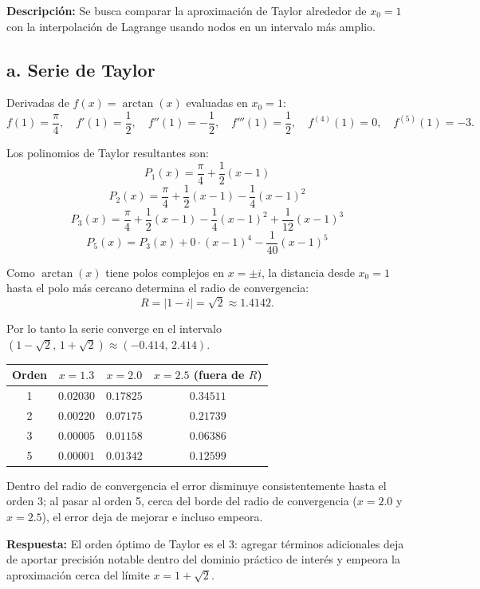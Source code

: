 \documentclass[12pt,a4paper]{article}
\begin{document}
\textbf{Descripci\'on:} Se busca comparar la aproximaci\'on de Taylor alrededor de $x_0=1$ con la interpolaci\'on de Lagrange usando nodos en un intervalo m\'as amplio.

\subsection*{a. Serie de Taylor}

Derivadas de $f(x) = \arctan(x)$ evaluadas en $x_0=1$:
\[
f(1) = \frac{\pi}{4}, \quad f'(1) = \frac{1}{2}, \quad f''(1) = -\frac{1}{2}, \quad f'''(1) = \frac{1}{2}, \quad f^{(4)}(1) = 0, \quad f^{(5)}(1) = -3.
\]

Los polinomios de Taylor resultantes son:
\[
P_1(x) = \frac{\pi}{4} + \frac{1}{2}(x-1)
\]
\[
P_2(x) = \frac{\pi}{4} + \frac{1}{2}(x-1) - \frac{1}{4}(x-1)^2
\]
\[
P_3(x) = \frac{\pi}{4} + \frac{1}{2}(x-1) - \frac{1}{4}(x-1)^2 + \frac{1}{12}(x-1)^3
\]
\[
P_5(x) = P_3(x) + 0\cdot(x-1)^4 - \frac{1}{40}(x-1)^5
\]

Como $\arctan(x)$ tiene polos complejos en $x=\pm i$, la distancia desde $x_0=1$ hasta el polo m\'as cercano determina el radio de convergencia:
\[
R = |1-i| = \sqrt{2} \approx 1.4142.
\]

Por lo tanto la serie converge en el intervalo $(1-\sqrt{2},\, 1+\sqrt{2}) \approx (-0.414,\, 2.414)$.

\begin{center}
\begin{tabular}{cccc}
\toprule
Orden & $x=1.3$ & $x=2.0$ & $x=2.5$ (fuera de $R$) \\
\midrule
1 & $0.02030$ & $0.17825$ & $0.34511$ \\
2 & $0.00220$ & $0.07175$ & $0.21739$ \\
3 & $0.00005$ & $0.01158$ & $0.06386$ \\
5 & $0.00001$ & $0.01342$ & $0.12599$ \\
\bottomrule
\end{tabular}
\end{center}

Dentro del radio de convergencia el error disminuye consistentemente hasta el orden 3; al pasar al orden 5, cerca del borde del radio de convergencia ($x=2.0$ y $x=2.5$), el error deja de mejorar e incluso empeora.

\textbf{Respuesta:} El orden \'optimo de Taylor es el $\boxed{3}$: agregar t\'erminos adicionales deja de aportar precisi\'on notable dentro del dominio pr\'actico de inter\'es y empeora la aproximaci\'on cerca del l\'imite $x=1+\sqrt{2}$.
\end{document}
